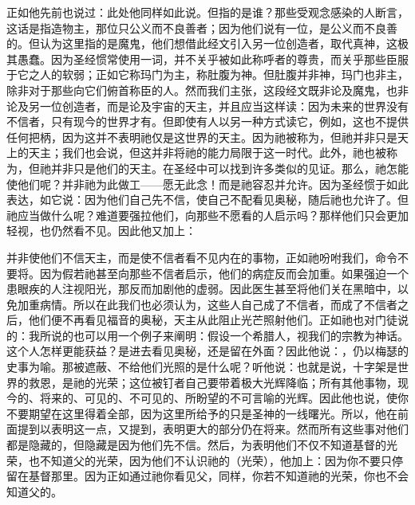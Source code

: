 正如他先前也说过：此处他同样如此说。但指的是谁？那些受观念感染的人断言，这话是指造物主，那位只公义而不良善者；因为他们说有一位，是公义而不良善的。但认为这里指的是魔鬼，他们想借此经文引入另一位创造者，取代真神，这极其愚蠢。因为圣经惯常使用一词，并不关乎被如此称呼者的尊贵，而关乎那些臣服于它之人的软弱；正如它称玛门为主，称肚腹为神。但肚腹并非神，玛门也非主，除非对于那些向它们俯首称臣的人。然而我们主张，这段经文既非论及魔鬼，也非论及另一位创造者，而是论及宇宙的天主，并且应当这样读：因为未来的世界没有不信者，只有现今的世界才有。但即使有人以另一种方式读它，例如，这也不提供任何把柄，因为这并不表明祂仅是这世界的天主。因为祂被称为，但祂并非只是天上的天主；我们也会说，但这并非将祂的能力局限于这一时代。此外，祂也被称为，但祂并非只是他们的天主。在圣经中可以找到许多类似的见证。那么，祂怎能使他们呢？并非祂为此做工——愿无此念！而是祂容忍并允许。因为圣经惯于如此表达，如它说：因为他们自己先不信，使自己不配看见奥秘，随后祂也允许了。但祂应当做什么呢？难道要强拉他们，向那些不愿看的人启示吗？那样他们只会更加轻视，也仍然看不见。因此他又加上：\par

\par

并非使他们不信天主，而是使不信者看不见内在的事物，正如祂吩咐我们，命令不要将。因为假若祂甚至向那些不信者启示，他们的病症反而会加重。如果强迫一个患眼疾的人注视阳光，那反而加剧他的虚弱。因此医生甚至将他们关在黑暗中，以免加重病情。所以在此我们也必须认为，这些人自己成了不信者，而成了不信者之后，他们便不再看见福音的奥秘，天主从此阻止光芒照射他们。正如祂也对门徒说的：我所说的也可以用一个例子来阐明：假设一个希腊人，视我们的宗教为神话。这个人怎样更能获益？是进去看见奥秘，还是留在外面？因此他说：，仍以梅瑟的史事为喻。那被遮蔽、不给他们光照的是什么呢？听他说：也就是说，十字架是世界的救恩，是祂的光荣；这位被钉者自己要带着极大光辉降临；所有其他事物，现今的、将来的、可见的、不可见的、所盼望的不可言喻的光辉。因此他也说，使你不要期望在这里得着全部，因为这里所给予的只是圣神的一线曙光。所以，他在前面提到以表明这一点，又提到，表明更大的部分仍在将来。然而所有这些事对他们都是隐藏的，但隐藏是因为他们先不信。然后，为表明他们不仅不知道基督的光荣，也不知道父的光荣，因为他们不认识祂的（光荣），他加上：因为你不要只停留在基督那里。因为正如通过祂你看见父，同样，你若不知道祂的光荣，你也不会知道父的。\par

